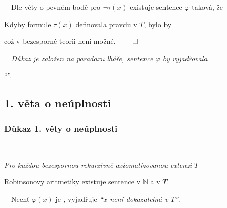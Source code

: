     \ \ Dle věty o pevném bodě pro $\neg\tau(x)$ existuje sentence $\varphi$ taková, že
    
    
    
    Kdyby formule $\tau(x)$ definovala pravdu v $T$, bylo by
    
    
    
    což v bezesporné teorii není možné. $\qed$
    \medskip
    
    \smallskip
    
    {\it {}\ \ Důkaz je založen na paradoxu lháře, sentence $\varphi$ by vyjadřovala
    \smallskip
    
    ``''.}
    
    
    
    \subsection*{1. věta o neúplnosti}
    \subsubsection*{Důkaz 1. věty o neúplnosti}
    \ \ {\it Pro každou bezespornou rekurzivně axiomatizovanou extenzi $T$
    
    
    Robinsonovy aritmetiky existuje sentence  v $\underline{\mathbb{N}}$ a  v $T$.}
    \medskip
    
    \smallskip
    
    \ \ Nechť $\varphi(x)$ je , vyjadřuje {\it ``$x$ není dokazatelná v $T$''}.
    
